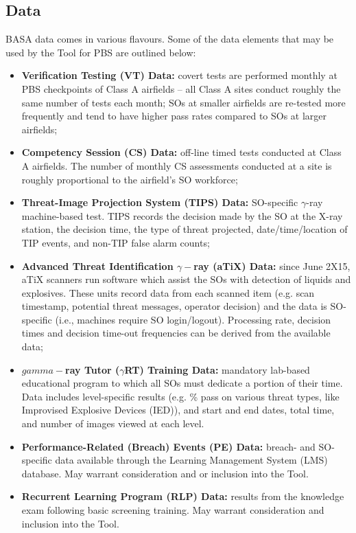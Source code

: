 \subsection{Data}
BASA data comes in various flavours. Some of the data elements that may be used by the Tool for PBS are outlined below:
\begin{itemize}[noitemsep]
\item \textbf{Verification Testing (VT) Data:} covert tests are performed monthly at PBS checkpoints of Class A airfields -- all Class A sites conduct roughly the same number of tests each month; SOs at smaller airfields are re-tested more frequently and tend to have higher pass rates compared to SOs at larger airfields;
\item \textbf{Competency Session (CS) Data:} off-line timed tests conducted at Class A airfields. The number of monthly CS assessments conducted at a site is roughly proportional to the airfield's SO workforce;
\item \textbf{Threat-Image Projection System (TIPS) Data:} SO-specific $\gamma$-ray machine-based test. TIPS records the decision made by the SO at the X-ray station, the decision time, the type of threat projected, date/time/location of TIP events, and non-TIP false alarm counts;
\item \textbf{Advanced Threat Identification $\gamma-$ray (aTiX) Data:} since June 2X15, aTiX scanners run software which assist the SOs with detection of liquids and explosives. These units record data from each scanned item (e.g. scan timestamp, potential threat messages, operator decision) and the data is SO-specific (i.e., machines require SO login/logout). Processing rate, decision times and decision time-out frequencies can be derived from the available data; 
\item \textbf{$gamma-$ray Tutor ($\gamma$RT) Training Data:} mandatory lab-based educational program to which all SOs must dedicate a portion of their time. Data includes level-specific results (e.g. \% pass on various threat types, like Improvised Explosive Devices (IED)), and start and end dates, total time, and number of images viewed at each level.
\item \textbf{Performance-Related (Breach) Events (PE) Data:} breach- and SO-specific data available through the Learning Management System (LMS) database. May warrant consideration and or inclusion into the Tool.
\item \textbf{Recurrent Learning Program (RLP) Data:} results from the knowledge exam following basic screening training. May warrant consideration and inclusion into the Tool.

\end{itemize}
